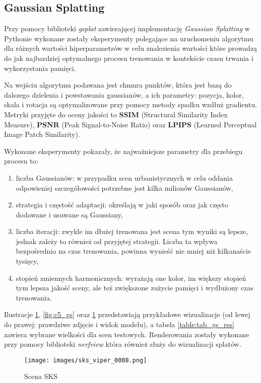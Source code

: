 \subsection{Gaussian Splatting}
Przy pomocy biblioteki \textit{gsplat}\cite{ye2024gsplatopensourcelibrarygaussian} zawierającej implementację \textit{Gaussian Splatting} w Pythonie wykonane zostały eksperymenty polegające na uruchomeniu algorytmu dla różnych wartości hiperparametrów w celu znalezienia wartości które prowadzą do jak najbardziej optymalnego procesu trenowania w kontekście czasu trwania i wykorzystania pamięci. 

Na wejściu algorytmu podawana jest chmura punktów, która jest bazą do dalszego dzielenia i powstawania gaussianów, a ich parametry: pozycja, kolor, skala i rotacja są optymalizowane przy pomocy metody spadku wzdłuż gradientu. Metryki przyjęte do oceny jakości to \textbf{SSIM} (Structural Similarity Index Measure), \textbf{PSNR} (Peak Signal-to-Noise Ratio) oraz \textbf{LPIPS} (Learned Perceptual Image Patch Similarity).

Wykonane eksperymenty pokazały, że najważniejsze parametry dla przebiegu procesu to: 
\begin{enumerate}
    \item liczba Gaussianów: w przypadku scen urbanistycznych w celu oddania odpowieniej szczegółowości potrzebne jest kilka milionów Gaussianów,
    \item strategia i częstość adaptacji: określają w jaki sposób oraz jak często dodawane i usuwane są Gaussiany, 
    \item liczba iteracji: zwykle im dłużej trenowana jest scena tym wyniki są lepsze, jednak zależy to również od przyjętej strategii. Liczba ta wpływa bezpośrednio na czas trenowania, powinna wynieść nie mniej niż kilkanaście tysięcy,
    \item stopień zmiennych harmonicznych: wyrażają one kolor, im większy stopień tym lepsza jakość sceny, ale też zwiększone zużycie pamięci i wydłużony czas trenowania. 
\end{enumerate}

Ilustracje \ref{fig:sks_gs}, \ref{fig:c5_gs} oraz \ref{fig:sks_gs} przedstawiają przykładowe wizualizacje (od lewej do prawej: prawdziwe zdjęcie i widok modelu), a tabela \ref{table:tab_gs_res} zawiera wybrane wielkości dla scen testowych. Renderowania zostały wykonane przy pomocy biblioteki \textit{nerfview} która również służy do wizualizacji splatów.

\begin{figure}[!h]
    \centering
    \texttt{[image: images/sks\_viper\_0008.png]}
    \caption{Scena SKS}
    \label{fig:sks_gs}
\end{figure}

